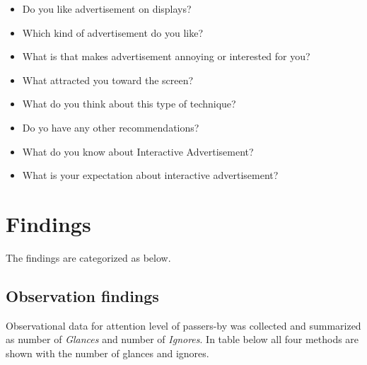 \begin{itemize}
\item Do you like advertisement on displays? 
\item Which kind of advertisement do you like? 
\item What is that makes advertisement annoying or interested for you? 
\item What attracted you toward the screen? 
\item What do you think about this type of technique? 
\item Do yo have any other recommendations? 
\item What do you know about Interactive Advertisement? 
\item What is your expectation about interactive advertisement? 
\end{itemize}



\section{Findings}
The findings are categorized as below.


\subsection{Observation findings}
Observational data for attention level of passers-by was collected and summarized as number of \emph{Glances} and number of \emph{Ignores}. In table below all four methods are shown with the number of glances and ignores. 

\begin{table}[H]
\caption{Cross tabulation of deployment and attention level }
\label{tab:crosstabulation}
\centering
{}
\end{table}


